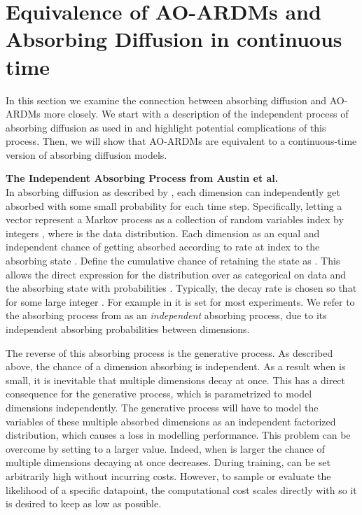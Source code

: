 \documentclass{article} \usepackage{iclr2022_conference,times}
\begin{document}
\section{Equivalence of AO-ARDMs and Absorbing Diffusion in continuous time}
\label{sec:diffusion_connection}
In this section we examine the connection between absorbing diffusion and AO-ARDMs more closely. We start with a description of the independent process of absorbing diffusion as used in \citep{austin2021structured} and highlight potential complications of this process. Then, we will show that AO-ARDMs are equivalent to a continuous-time version of absorbing diffusion models.


\textbf{The Independent Absorbing Process from Austin et al.} \\
In absorbing diffusion as described by \citep{austin2021structured}, each dimension can independently get absorbed with some small probability for each time step. Specifically, letting a vector  represent a Markov process as a collection of random variables index by integers , where  is the data distribution. Each dimension  as an equal and independent chance of getting absorbed according to rate  at index  to the absorbing state . Define the cumulative chance of retaining the state as . This allows the direct expression for the distribution over  as categorical on data and the absorbing state  with probabilities . Typically, the decay rate  is chosen so that  for some large integer . For example in \citep{austin2021structured} it is set  for most experiments. We refer to the absorbing process from \citep{austin2021structured} as an \textit{independent} absorbing process, due to its independent absorbing probabilities between dimensions.


The reverse of this absorbing process is the generative process. As described above, the chance of a dimension absorbing is independent. As a result when  is small, it is inevitable that multiple dimensions decay at once. This has a direct consequence for the generative process, which is parametrized to model dimensions independently. The generative process will have to model the variables of these multiple absorbed dimensions as an independent factorized distribution, which causes a loss in modelling performance. This problem can be overcome by setting  to a larger value. Indeed, when  is larger the chance of multiple dimensions decaying at once decreases. During training,  can be set arbitrarily high without incurring costs. However, to sample or evaluate the likelihood of a specific datapoint, the computational cost scales directly with  so it is desired to keep  as low as possible. 
\end{document}
